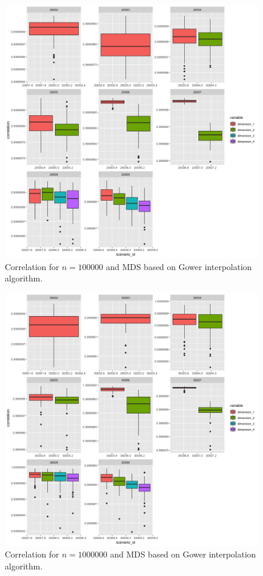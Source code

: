 \documentclass[11pt]{report}
\begin{document}
\begin{figure}[ht]
\centering
    \includegraphics[scale = 1.5]{./images/gower_correlation_100000.png}
    \caption{Correlation for $n = 100000$ and MDS based on Gower interpolation algorithm.}
    \label{gower_correlation_100000}
\end{figure}

\begin{figure}[ht]
\centering
    \includegraphics[scale = 1.5]{./images/gower_correlation_1000000.png}
    \caption{Correlation for $n = 1000000$ and MDS based on Gower interpolation algorithm.}
    \label{gower_correlation_1000000}
\end{figure}
\end{document}
